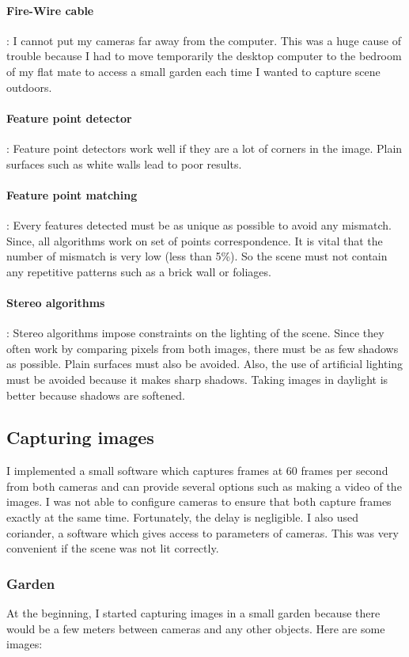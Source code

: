 \documentclass[11pt]{report}
\begin{document}
\paragraph{Fire-Wire cable}: I cannot put my cameras far away from the computer. This was a huge cause of trouble because I had to move temporarily the desktop computer to the bedroom of my flat mate to access a small garden each time I wanted to capture scene outdoors.
\paragraph{Feature point detector}: Feature point detectors work well if they are a lot of corners in the image. Plain surfaces such as white walls lead to poor results.
\paragraph{Feature point matching}: Every features detected must be as unique as possible to avoid any mismatch. Since, all algorithms work on set of points correspondence. It is vital that the number of mismatch is very low (less than 5\%). So the scene must not contain any repetitive patterns such as a brick wall or foliages.
\paragraph{Stereo algorithms}: Stereo algorithms impose constraints on the lighting of the scene. Since they often work by comparing pixels from both images, there must be as few shadows as possible. Plain surfaces must also be avoided. Also, the use of artificial lighting must be avoided because it makes sharp shadows. Taking images in daylight is better because shadows are softened.

\subsection{Capturing images}

I implemented a small software which captures frames at 60 frames per second from both cameras and can provide several options such as making a video of the images. I was not able to configure cameras to ensure that both capture frames exactly at the same time. Fortunately, the delay is negligible. I also used coriander, a software which gives access to parameters of cameras. This was very convenient if the scene was not lit correctly.


\subsubsection{Garden}
At the beginning, I started capturing images in a small garden because there would be a few meters between cameras and any other objects. Here are some images:
\end{document}
